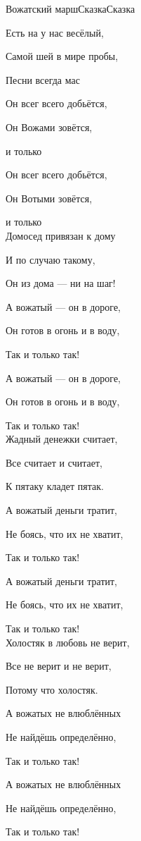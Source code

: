 \documentclass[11pt,a5paper]{book}
\begin{document}
\begin{song}{Вожатский марш}{}{Сказка}{Сказка}{}{}

Есть на у нас весёлый,\par
Самой шей в мире пробы,\par
Песни  всегда мас\par
Он всег всего добьётся,\par
Он Вожами зовётся,\par
{} и только \par
Он всег всего добьётся,\par
Он Вотыми зовётся,\par
{} и только \\

Домосед привязан к дому\par
И по случаю такому,\par
Он из дома — ни на шаг!\par
А вожатый — он в дороге,\par
Он готов в огонь и в воду,\par
Так и только так!\par
А вожатый — он в дороге,\par
Он готов в огонь и в воду,\par
Так и только так!\\
\newpage
Жадный денежки считает,\par
Все считает и считает,\par
К пятаку кладет пятак.\par
А вожатый деньги тратит,\par
Не боясь, что их не хватит,\par
Так и только так!\par
А вожатый деньги тратит,\par
Не боясь, что их не хватит,\par
Так и только так!\\

Холостяк в любовь не верит,\par
Все не верит и не верит,\par
Потому что холостяк.\par
А вожатых не влюблённых\par
Не найдёшь определённо,\par
Так и только так!\par
А вожатых не влюблённых\par
Не найдёшь определённо,\par
Так и только так!\par


\end{song}
\end{document}
